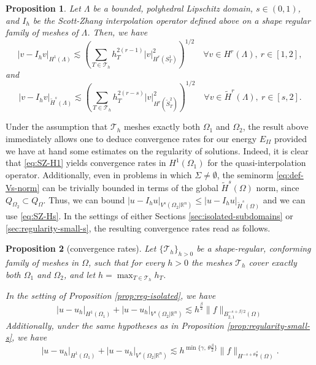 \documentclass{amsart}
\newcommand{\domain}{\Lambda}
\newcommand{\Ol}{\Omega_{1}}%
\newcommand{\Onl}{\Omega_{2}}%
\newcommand{\Th}{{\mathcal {T}_h}}
\def\R{{\mathbb R}}
\theoremstyle{plain}
\newtheorem{proposition}{Proposition}
\numberwithin{equation}{section}
\numberwithin{table}{section}
\numberwithin{figure}{section}
\numberwithin{theorem}{section}
\numberwithin{corollary}{section}
\numberwithin{definition}{section}
\numberwithin{lemma}{section}
\numberwithin{proposition}{section}
\numberwithin{remark}{section}
\begin{document}
\begin{proposition} Let $\domain$ be a bounded, polyhedral Lipschitz domain, $s \in (0,1)$, and $I_h$ be the Scott-Zhang interpolation operator defined above on a shape regular family of meshes of $\domain$. Then, we have
\begin{equation} \label{eq:SZ-H1}
 |v - I_h v |_{H^1(\domain)} \lesssim \left(\sum_{T \in \Th} h_T^{2(r-1)} |v|_{H^r(S^1_T)}^2 \right)^{1/2} \quad \forall v \in H^r(\domain), \ r \in [1, 2],
\end{equation}
and
\begin{equation} \label{eq:SZ-Hs}
 |v - I_h v |_{\widetilde H^s(\domain)} \lesssim \left(\sum_{T \in \Th} h_T^{2(r-s)} |v|_{H^r(\widetilde S^2_T)}^2 \right)^{1/2} \quad \forall v \in \widetilde H^r(\domain), \ r \in [s, 2].
\end{equation}\end{proposition}

Under the assumption that $\Th$ meshes exactly both $\Ol$ and $\Onl$, the result above immediately allows one to deduce convergence rates for our energy $E_{II}$ provided we have at hand some estimates on the regularity of solutions. Indeed, it is clear that \eqref{eq:SZ-H1} yields convergence rates in $H^1(\Ol)$ for the quasi-interpolation operator. Additionally, even in problems in which $\Sigma \neq \emptyset$, the seminorm \eqref{eq:def-Vs-norm} can be trivially bounded in terms of the global $\widetilde H^s(\Omega)$ norm, since $Q_{\Onl} \subset Q_\Omega$. Thus, we can bound $|u - I_h u|_{V^s(\Onl | \R^n)} \le |u - I_h u|_{\widetilde H^s(\Omega)}$ and we can use \eqref{eq:SZ-Hs}. In the settings of either Sections \ref{sec:isolated-subdomains} or \ref{sec:regularity-small-s}, the resulting convergence rates read as follows.

\begin{proposition}[convergence rates] \label{prop:conv-rates} Let  $\{\Th \}_{h>0}$ be a shape-regular, conforming family of meshes in $\Omega$, such that for every $h>0$ the meshes $\Th$ cover exactly both $\Ol$ and $\Onl$, and let  $h = \max_{T \in \Th} h_T$.

In the setting of Proposition \ref{prop:reg-isolated}, we have
\[
| u - u_h|_{H^1(\Ol)} + | u - u_h|_{V^s(\Onl | \R^n)} \lesssim h^{\frac\beta2} \| f \|_{B^{-s+\beta/2}_{2,1}(\Omega)}
\]
Additionally, under the same hypotheses as in Proposition \ref{prop:regularity-small-s}, we have
\[
| u - u_h|_{H^1(\Ol)} + | u - u_h|_{V^s(\Onl | \R^n)} \lesssim h^{\min\{\gamma, \, \theta\frac\beta2\}} \| f \|_{ H^{-s+\theta\frac\beta2}(\Omega)}.
\]
\end{proposition}
\end{document}
